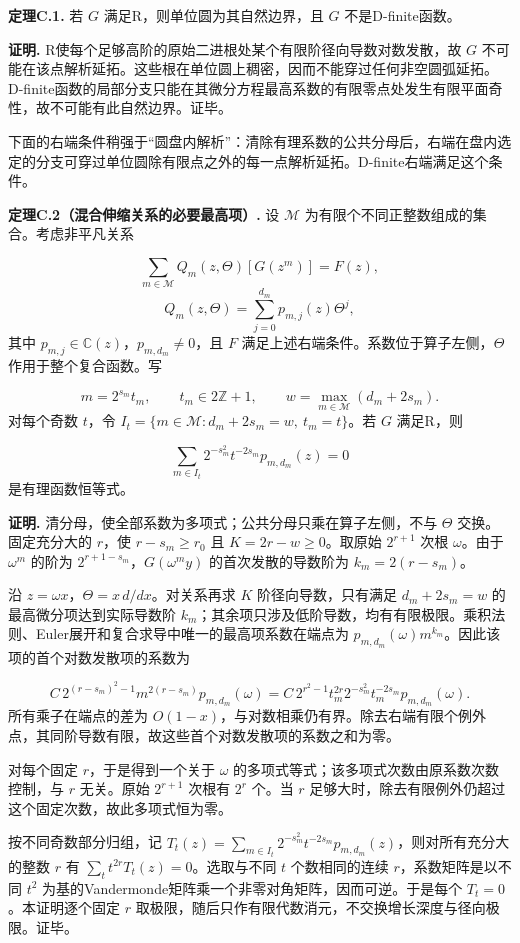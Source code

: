\documentclass[12pt,a4paper]{article}
\begin{document}
\textbf{定理C.1.} 若 $G$ 满足R，则单位圆为其自然边界，且 $G$ 不是D-finite函数。

\textbf{证明.} R使每个足够高阶的原始二进根处某个有限阶径向导数对数发散，故 $G$ 不可能在该点解析延拓。这些根在单位圆上稠密，因而不能穿过任何非空圆弧延拓。D-finite函数的局部分支只能在其微分方程最高系数的有限零点处发生有限平面奇性，故不可能有此自然边界。证毕。

下面的右端条件稍强于“圆盘内解析”：清除有理系数的公共分母后，右端在盘内选定的分支可穿过单位圆除有限点之外的每一点解析延拓。D-finite右端满足这个条件。

\textbf{定理C.2（混合伸缩关系的必要最高项）.} 设 $\mathcal M$ 为有限个不同正整数组成的集合。考虑非平凡关系

\[
\sum_{m\in\mathcal M}Q_m(z,\Theta)[G(z^m)]=F(z),
\]
\[
Q_m(z,\Theta)=\sum_{j=0}^{d_m}p_{m,j}(z)\Theta^j,
\]
其中 $p_{m,j}\in\mathbb C(z)$，$p_{m,d_m}\ne0$，且 $F$ 满足上述右端条件。系数位于算子左侧，$\Theta$ 作用于整个复合函数。写

\[
m=2^{s_m}t_m,\qquad t_m\in2\mathbb Z+1,\qquad w=\max_{m\in\mathcal M}(d_m+2s_m).
\]
对每个奇数 $t$，令 $I_t=\{m\in\mathcal M:d_m+2s_m=w,\ t_m=t\}$。若 $G$ 满足R，则

\[
\sum_{m\in I_t}2^{-s_m^2}t^{-2s_m}p_{m,d_m}(z)=0
\]
是有理函数恒等式。

\textbf{证明.} 清分母，使全部系数为多项式；公共分母只乘在算子左侧，不与 $\Theta$ 交换。固定充分大的 $r$，使 $r-s_m\ge r_0$ 且 $K=2r-w\ge0$。取原始 $2^{r+1}$ 次根 $\omega$。由于 $\omega^m$ 的阶为 $2^{r+1-s_m}$，$G(\omega^m y)$ 的首次发散的导数阶为 $k_m=2(r-s_m)$。

沿 $z=\omega x$，$\Theta=x\,d/dx$。对关系再求 $K$ 阶径向导数，只有满足 $d_m+2s_m=w$ 的最高微分项达到实际导数阶 $k_m$；其余项只涉及低阶导数，均有有限极限。乘积法则、Euler展开和复合求导中唯一的最高项系数在端点为 $p_{m,d_m}(\omega)m^{k_m}$。因此该项的首个对数发散项的系数为

\[
C\,2^{(r-s_m)^2-1}m^{2(r-s_m)}p_{m,d_m}(\omega)
=C\,2^{r^2-1}t_m^{2r}2^{-s_m^2}t_m^{-2s_m}p_{m,d_m}(\omega).
\]
所有乘子在端点的差为 $O(1-x)$，与对数相乘仍有界。除去右端有限个例外点，其同阶导数有限，故这些首个对数发散项的系数之和为零。

对每个固定 $r$，于是得到一个关于 $\omega$ 的多项式等式；该多项式次数由原系数次数控制，与 $r$ 无关。原始 $2^{r+1}$ 次根有 $2^r$ 个。当 $r$ 足够大时，除去有限例外仍超过这个固定次数，故此多项式恒为零。

按不同奇数部分归组，记 $T_t(z)=\sum_{m\in I_t}2^{-s_m^2}t^{-2s_m}p_{m,d_m}(z)$，则对所有充分大的整数 $r$ 有 $\sum_t t^{2r}T_t(z)=0$。选取与不同 $t$ 个数相同的连续 $r$，系数矩阵是以不同 $t^2$ 为基的Vandermonde矩阵乘一个非零对角矩阵，因而可逆。于是每个 $T_t=0$。本证明逐个固定 $r$ 取极限，随后只作有限代数消元，不交换增长深度与径向极限。证毕。
\end{document}
